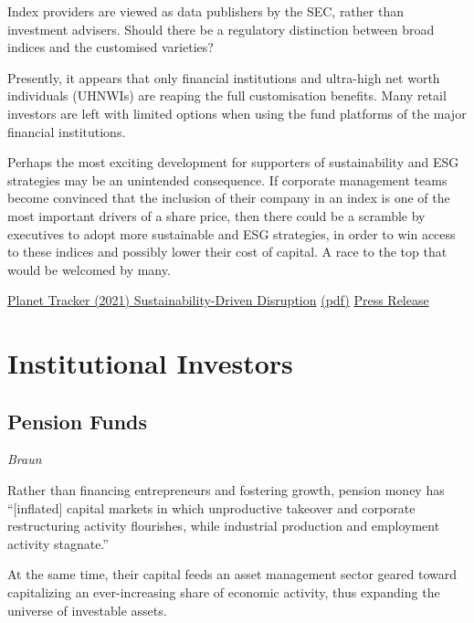 \documentclass[
]{book}
\begin{document}
Index providers are viewed as data publishers by the SEC, rather than investment advisers. Should
there be a regulatory distinction between broad indices and the customised varieties?

Presently, it appears that only financial institutions and ultra-high net worth individuals (UHNWIs)
are reaping the full customisation benefits. Many retail investors are left with limited options when
using the fund platforms of the major financial institutions.

Perhaps the most exciting development for supporters of sustainability and ESG strategies may be
an unintended consequence. If corporate management teams become convinced that the inclusion
of their company in an index is one of the most important drivers of a share price, then there could
be a scramble by executives to adopt more sustainable and ESG strategies, in order to win access to
these indices and possibly lower their cost of capital. A race to the top that would be welcomed by
many.

\href{https://planet-tracker.org/tracker-programmes/cross-programme-papers/\#indexing-prepare-for-sustainability-driven-disruption}{Planet Tracker (2021) Sustainability-Driven Disruption}
\href{pdf/Planettracker_2021_Indexing.pdf}{(pdf)}
\href{https://planet-tracker.org/large-index-providers-should-prepare-for-disruption-says-planet-tracker/}{Press Release}

\hypertarget{institutional-investors-1}{%
\chapter{Institutional Investors}\label{institutional-investors-1}}

\hypertarget{pension-funds}{%
\section{Pension Funds}\label{pension-funds}}

\emph{Braun}

Rather than
financing entrepreneurs and fostering growth,
pension money has ``{[}inflated{]} capital markets in
which unproductive takeover and corporate
restructuring activity flourishes, while industrial
production and employment activity stagnate.''

At the same time, their capital feeds an asset
management sector geared toward capitalizing an
ever-increasing share of economic activity, thus
expanding the universe of investable assets.
\end{document}
